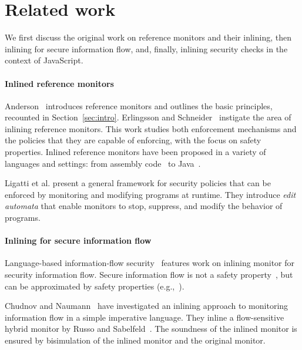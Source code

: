\documentclass{llncs}
\begin{document}
\section{Related work}
\label{sec:related}
We first discuss the original work on reference monitors and their
inlining, then
inlining for secure information flow, 
and, finally,
inlining security checks in the context of
JavaScript.

\paragraph{Inlined reference monitors}
Anderson~\cite{Anderson:72} introduces reference monitors and
outlines the basic principles, recounted in Section~\ref{sec:intro}.
%
Erlingsson and Schneider~\cite{DBLP:conf/nspw/ErlingssonS99,Erlingsson:PhD04} instigate
the area of inlining reference monitors. 
This work studies both enforcement mechanisms and the policies
that they are capable of enforcing, with the focus on safety properties.
Inlined reference monitors
have been proposed in a variety of languages and settings: from
assembly code~\cite{DBLP:conf/nspw/ErlingssonS99} to Java~\cite{DBLP:conf/ecoop/DamJLP09,DBLP:journals/jcs/DamJLP10,DBLP:conf/ccs/DamGL12}.

Ligatti et al. \cite{Ligatti05editautomata:} present a 
general framework for security policies that can
be enforced by monitoring and modifying programs at runtime. 
They introduce \emph{edit automata} that enable
monitors to stop, suppress, and modify the behavior of programs. 



\paragraph{Inlining for secure information flow}
Language-based information-flow security~\cite{Sabelfeld:Myers:JSAC}
features work on inlining monitor for security information flow.
Secure information flow is not
a safety property~\cite{McLean:SSP94}, but can be approximated by
safety properties
(e.g.,~\cite{Boudol:FAST08,Sabelfeld:Russo:PSI09,Austin:Flanagan:PLAS09}).

Chudnov and
Naumann~\cite{Chudnov:Naumann:CSF10} have investigated an inlining
approach to monitoring information flow in a simple imperative language. They inline a flow-sensitive
hybrid monitor by Russo and
Sabelfeld~\cite{Russo:Sabelfeld:CSF10}. The soundness of the inlined
monitor is ensured by bisimulation of the inlined monitor and the
original monitor.
\end{document}
